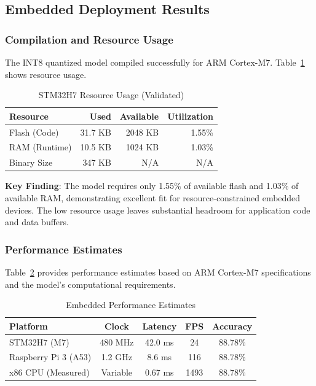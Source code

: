\subsection{Embedded Deployment Results}

\subsubsection{Compilation and Resource Usage}

The INT8 quantized model compiled successfully for ARM Cortex-M7. Table~\ref{tab:embedded_resources} shows resource usage.

\begin{table}[h]
\centering
\caption{STM32H7 Resource Usage (Validated)}
\label{tab:embedded_resources}
\begin{tabular}{lrrr}
\hline
\textbf{Resource} & \textbf{Used} & \textbf{Available} & \textbf{Utilization} \\
\hline
Flash (Code)    & 31.7 KB  & 2048 KB & 1.55\% \\
RAM (Runtime)   & 10.5 KB  & 1024 KB & 1.03\% \\
Binary Size     & 347 KB   & N/A     & N/A \\
\hline
\end{tabular}
\end{table}

\textbf{Key Finding}: The model requires only 1.55\% of available flash and 1.03\% of available RAM, demonstrating excellent fit for resource-constrained embedded devices. The low resource usage leaves substantial headroom for application code and data buffers.

\subsubsection{Performance Estimates}

Table~\ref{tab:embedded_performance} provides performance estimates based on ARM Cortex-M7 specifications and the model's computational requirements.

\begin{table}[h]
\centering
\caption{Embedded Performance Estimates}
\label{tab:embedded_performance}
\begin{tabular}{lcccc}
\hline
\textbf{Platform} & \textbf{Clock} & \textbf{Latency} & \textbf{FPS} & \textbf{Accuracy} \\
\hline
STM32H7 (M7)      & 480 MHz  & 42.0 ms & 24  & 88.78\% \\
Raspberry Pi 3 (A53) & 1.2 GHz & 8.6 ms  & 116 & 88.78\% \\
x86 CPU (Measured) & Variable & 0.67 ms & 1493 & 88.78\% \\
\hline
\end{tabular}
\end{table}

